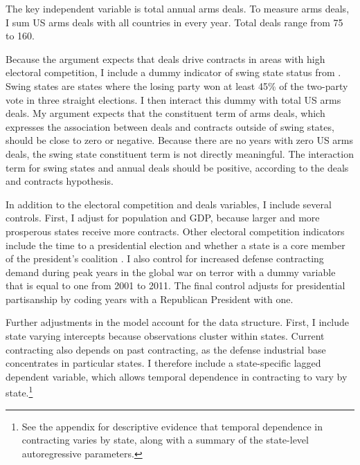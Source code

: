 \documentclass[12pt]{article}
\begin{document}
The key independent variable is total annual arms deals.  
To measure arms deals, I sum US arms deals with all countries in every year. 
Total deals range from 75 to 160. 


Because the argument expects that deals drive contracts in areas with high electoral competition, I include a dummy indicator of swing state status from \citet{KrinerReeves2015}.
Swing states are states where the losing party won at least 45\% of the two-party vote in three straight elections. 
I then interact this dummy with total US arms deals. 
My argument expects that the constituent term of arms deals, which expresses the association between deals and contracts outside of swing states, should be close to zero or negative.
Because there are no years with zero US arms deals, the swing state constituent term is not directly meaningful.  
The interaction term for swing states and annual deals should be positive, according to the deals and contracts hypothesis.


In addition to the electoral competition and deals variables, I include several controls. 
First, I adjust for population and GDP, because larger and more prosperous states receive more contracts. 
Other electoral competition indicators include the time to a presidential election and whether a state is a core member of the president's coalition \citep{KrinerReeves2015}. 
I also control for increased defense contracting demand during peak years in the global war on terror with a dummy variable that is equal to one from 2001 to 2011. 
The final control adjusts for presidential partisanship by coding years with a Republican President with one. 


Further adjustments in the model account for the data structure.
First, I include state varying intercepts because observations cluster within states. 
Current contracting also depends on past contracting, as the defense industrial base concentrates in particular states. 
I therefore include a state-specific lagged dependent variable, which allows temporal dependence in contracting to vary by state.\footnote{See the appendix for descriptive evidence that temporal dependence in contracting varies by state, along with a summary of the state-level autoregressive parameters.}


\end{document}
